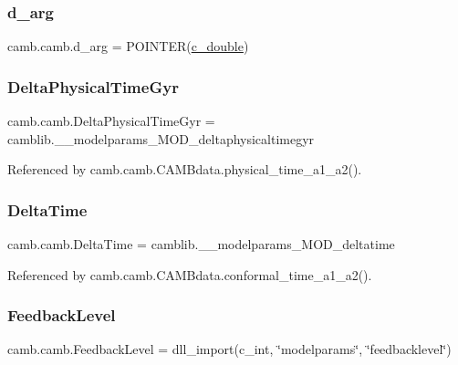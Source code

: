 \subsubsection{\texorpdfstring{d\+\_\+arg}{d\_arg}}
{\footnotesize\ttfamily camb.\+camb.\+d\+\_\+arg = P\+O\+I\+N\+T\+ER(\mbox{\hyperlink{namespacecamb_1_1camb_a9bb9b4d27cefdc5b8d0c9ecf508462cf}{c\+\_\+double}})}

\mbox{\label{namespacecamb_1_1camb_a0d78e19381b7a6fb313de6fccfe2821a}} 
\subsubsection{\texorpdfstring{Delta\+Physical\+Time\+Gyr}{DeltaPhysicalTimeGyr}}
{\footnotesize\ttfamily camb.\+camb.\+Delta\+Physical\+Time\+Gyr = camblib.\+\_\+\+\_\+modelparams\+\_\+\+M\+O\+D\+\_\+deltaphysicaltimegyr}



Referenced by camb.\+camb.\+C\+A\+M\+Bdata.\+physical\+\_\+time\+\_\+a1\+\_\+a2().

\mbox{\label{namespacecamb_1_1camb_a66e26cbf3357d7c21808dc7af9d2f01f}} 
\subsubsection{\texorpdfstring{Delta\+Time}{DeltaTime}}
{\footnotesize\ttfamily camb.\+camb.\+Delta\+Time = camblib.\+\_\+\+\_\+modelparams\+\_\+\+M\+O\+D\+\_\+deltatime}



Referenced by camb.\+camb.\+C\+A\+M\+Bdata.\+conformal\+\_\+time\+\_\+a1\+\_\+a2().

\mbox{\label{namespacecamb_1_1camb_a46c7b4fa92f12fb863c881ba88e35a8e}} 
\subsubsection{\texorpdfstring{Feedback\+Level}{FeedbackLevel}}
{\footnotesize\ttfamily camb.\+camb.\+Feedback\+Level = dll\+\_\+import(c\+\_\+int, \char`\"{}modelparams\char`\"{}, \char`\"{}feedbacklevel\char`\"{})}

